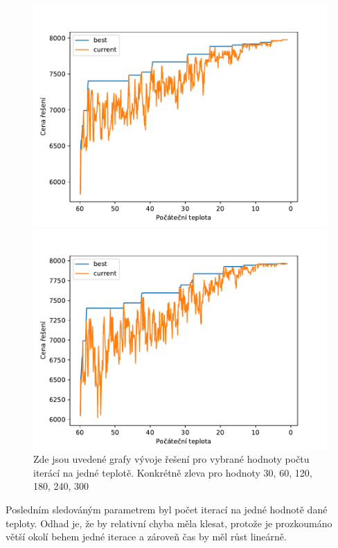 \documentclass[11pt]{article}
\begin{document}
\begin{figure}
\begin{minipage}[c]{0.32\textwidth}
        \centering \includegraphics[width=\textwidth]{img/C240.pdf} 
    \end{minipage}
    \begin{minipage}[c]{0.32\textwidth}
        \centering \includegraphics[width=\textwidth]{img/C300.pdf} 
    \end{minipage}
   \caption{Zde jsou uvedené grafy vývoje řešení pro vybrané hodnoty počtu iterácí na jedné teplotě. Konkrétně zleva pro hodnoty 30, 60, 120, 180, 240, 300}\label{fig:GVPC}
\end{figure} 

Posledním sledováným parametrem byl počet iterací na jedné hodnotě dané teploty. Odhad je, že by relativní chyba měla klesat, protože je prozkoumáno větší okolí behem jedné iterace a zároveň čas by měl růst lineárně.
  
\end{document}
